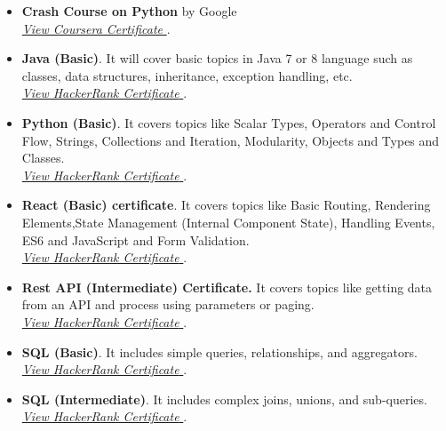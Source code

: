 \begin{itemize}
\item \textbf{Crash Course on Python} by Google\\ \href{https://coursera.org/share/cd82c8c590172184167df1d3a7241d24}{\textit{View Coursera Certificate} \faExternalLink}.
\item \textbf{Java (Basic)}. It will cover basic topics in Java 7 or 8 language such as classes, data structures, inheritance, exception handling, etc. \\
\href{https://www.hackerrank.com/certificates/21d415f74e9e}{\textit{View HackerRank Certificate} \faExternalLink}.
\item \textbf{Python (Basic)}. It covers topics like Scalar Types, Operators and Control Flow, Strings, Collections and Iteration, Modularity, Objects and Types and Classes.\\ 
\href{https://www.hackerrank.com/certificates/8aefe3cb8512}{\textit{View HackerRank Certificate} \faExternalLink}.
\item \textbf{React (Basic) certificate}. It covers topics like Basic Routing, Rendering Elements,State Management (Internal Component State), Handling Events, ES6 and JavaScript and Form Validation.\\ \href{https://www.hackerrank.com/certificates/53766ba3aa6e}{\textit{View HackerRank Certificate} \faExternalLink}.
\item \textbf{Rest API (Intermediate) Certificate.} It covers topics like getting data from an API and process using parameters or paging.\\ \href{https://www.hackerrank.com/certificates/da2ef642295f}{\textit{View HackerRank Certificate} \faExternalLink}.
\item \textbf{SQL (Basic)}. It includes simple queries, relationships, and aggregators. \\ \href{https://www.hackerrank.com/certificates/1f2cef07410b}{\textit{View HackerRank Certificate} \faExternalLink}.
\item \textbf{SQL (Intermediate)}. It includes complex joins, unions, and sub-queries.\\ \href{https://www.hackerrank.com/certificates/127fe801740d}{\textit{View HackerRank Certificate} \faExternalLink}.
\end{itemize}







